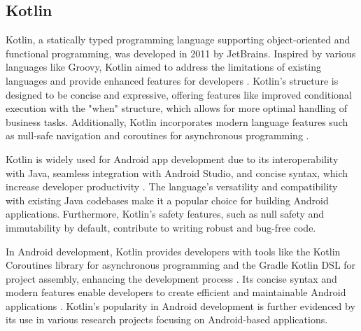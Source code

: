 \subsection{Kotlin}
Kotlin, a statically typed programming language supporting object-oriented and functional programming, was developed in 2011 by JetBrains. Inspired by various languages like Groovy, Kotlin aimed to address the limitations of existing languages and provide enhanced features for developers \cite{king2020history}. Kotlin's structure is designed to be concise and expressive, offering features like improved conditional execution with the "when" structure, which allows for more optimal handling of business tasks. Additionally, Kotlin incorporates modern language features such as null-safe navigation and coroutines for asynchronous programming \cite{li2022mapping}. 
\par
Kotlin is widely used for Android app development due to its interoperability with Java, seamless integration with Android Studio, and concise syntax, which increase developer productivity \cite{li2022mapping}. The language's versatility and compatibility with existing Java codebases make it a popular choice for building Android applications. Furthermore, Kotlin's safety features, such as null safety and immutability by default, contribute to writing robust and bug-free code.
\par
In Android development, Kotlin provides developers with tools like the Kotlin Coroutines library for asynchronous programming and the Gradle Kotlin DSL for project assembly, enhancing the development process \cite{king2020history}. Its concise syntax and modern features enable developers to create efficient and maintainable Android applications \cite{kartinah2023android}. Kotlin's popularity in Android development is further evidenced by its use in various research projects focusing on Android-based applications. 
